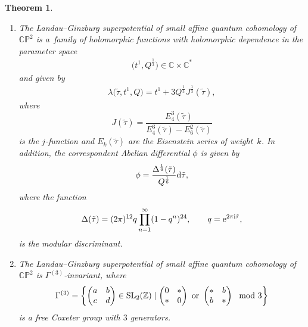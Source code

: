 \documentclass[pdftex]{sigma}
\numberwithin{equation}{section}
\newtheorem{Theorem}{Theorem}[section]
\begin{document}
\begin{Theorem}\quad
\begin{enumerate}\itemsep=0pt
\item[$(1)$] The Landau--Ginzburg superpotential of small affine quantum cohomology of $\mathbb{CP}^2$ is a~family of holomorphic functions
with holomorphic dependence in the parameter space
\begin{gather}\label{parameter space small affine quantum cohomology}
\bigl(t^1,Q^{\frac{1}{3}}\bigr)\in \mathbb{C}\times\mathbb{C}^{*}
\end{gather}
 and given by
\begin{gather}\label{lg superpotential of small quantum cohomology j function intro}
\lambda\bigl(\tilde\tau, t^1, Q\bigr)=t^1+3Q^{\frac{1}{3}}J^{\frac{1}{3}}(\tilde\tau),
\end{gather}
where
\[
J(\tilde\tau)=\frac{E_4^3(\tilde\tau)}{E_4^3(\tilde\tau)-E_6^2(\tilde\tau)}
\]
is the $j$-function and $E_k(\tilde\tau)$ are the Eisenstein series of weight~$k$.
In addition, the correspondent Abelian differential $\phi$ is given by
\[
\phi=\frac{\Delta^{\frac{1}{6}}(\tilde\tau)}{Q^{\frac{1}{6}}}{\rm d}\tilde \tau,
\]
where the function
\begin{gather*}
\Delta(\tilde\tau)=(2\pi)^{12}q\prod_{n=1}^{\infty}(1-q^n)^{24}, \qquad q={\rm e}^{2\pi {\rm i}\tilde\tau},
\end{gather*}
is the modular discriminant.
\item[$(2)$] The Landau--Ginzburg superpotential of small affine quantum cohomology of $\mathbb{CP}^2$ is $\Gamma^{(3)}$-invariant, where
\begin{gather}\label{Group gamma 3 intro}
\Gamma^{(3)}=\left\{ \begin{pmatrix}
a & b\\
c& d\\
\end{pmatrix} \in {\rm SL}_2(\mathbb{Z}) \mid \begin{pmatrix}
0 & *\\
*& 0\\
\end{pmatrix} \text{ or } \begin{pmatrix}
* & b\\
b& *\\
\end{pmatrix} \mod 3\right\}
\end{gather}
 is a free Coxeter group with $3$ generators.
\end{enumerate}
\end{Theorem}
\end{document}

